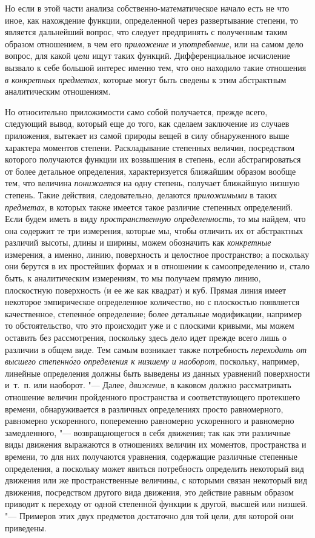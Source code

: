 Но если в этой части анализа собственно-математическое начало есть не что
иное, как нахождение функции, определенной через развертывание степени, то
является дальнейший вопрос, что следует предпринять с полученным таким
образом отношением, в чем его {\em приложение} и
{\em употребление}, или на самом дело вопрос, для какой
{\em цели} ищут таких функций. Дифференциальное
исчисление вызвало к себе большой интерес именно тем, что оно находило
такие отношения {\em в конкретных предметах}, которые
могут быть сведены к этим абстрактным аналитическим отношениям.

Но относительно приложимости само собой получается, прежде всего, следующий
вывод, который еще до того, как сделаем заключение из случаев приложения,
вытекает из самой природы вещей в силу обнаруженного выше характера
моментов степени. Раскладывание степенных величин, посредством которого
получаются функции их возвышения в степень, если абстрагироваться от более
детальное определения, характеризуется ближайшим образом вообще тем, что
величина {\em понижается} на одну степень, получает
ближайшую низшую степень. Такие действия, следовательно, делаются
{\em приложимыми} в таких
{\em предметах}, в которых также имеется такое различие
степенных определений. Если будем иметь в виду
{\em пространственную определенность}, то мы найдем,
что она содержит те три измерения, которые мы, чтобы отличить их от
абстрактных различий высоты, длины и ширины, можем обозначить как
{\em конкретные} измерения, а именно, линию,
поверхность и целостное пространство; а поскольку они берутся в их
простейших формах и в отношении к самоопределению и, стало быть, к
аналитическим измерениям, то мы получаем прямую линию, плоскостную
поверхность (и ее же как квадрат) и куб. Прямая линия имеет некоторое
эмпирическое определенное количество, но с плоскостью появляется
качественное, степенн\'{о}е определение; более детальные модификации, например
то обстоятельство, что это происходит уже и с плоскими кривыми, мы можем
оставить без рассмотрения, поскольку здесь дело идет прежде всего лишь о
различии в общем виде. Тем самым возникает также потребность
{\em переходить от высшего степенн\'{о}го определения к
низшему и наоборот}, поскольку, например, линейные определения должны быть
выведены из данных уравнений поверхности и~т.~п. или наоборот. "--- Далее,
{\em движение}, в каковом должно рассматривать
отношение величин пройденного пространства и соответствующего протекшего
времени, обнаруживается в различных определениях просто равномерного,
равномерно ускоренного, попеременно равномерно ускоренного и равномерно
замедленного, "--- возвращающегося в себя движения; так как эти различные виды
движения выражаются в отношениях величин их моментов, пространства и
времени, то для них получаются уравнения, содержащие различные степенные
определения, а поскольку может явиться потребность определить некоторый вид
движения или же пространственные величины, с которыми связан некоторый вид
движения, посредством другого вида движения, это действие равным образом
приводит к переходу от одной степенн\'{о}й функции к другой, высшей или низшей.
"--- Примеров этих двух предметов достаточно для той цели, для которой они
приведены.

